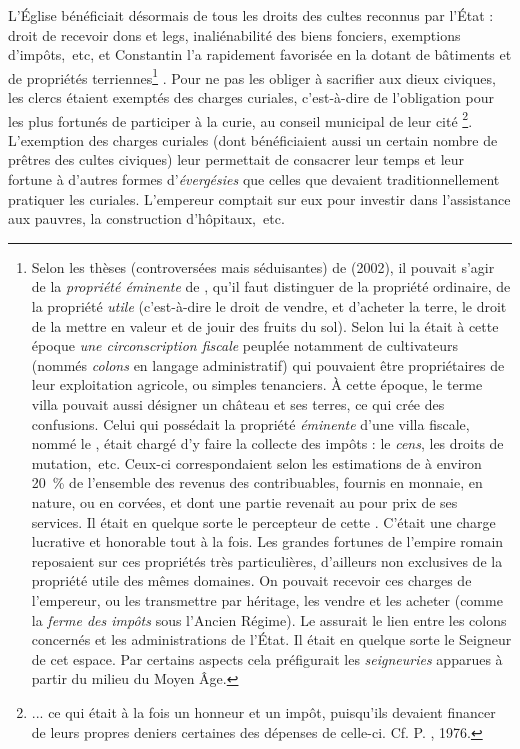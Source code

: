  L'Église bénéficiait désormais de tous les droits des cultes reconnus par l'État : droit de recevoir dons et legs, inaliénabilité des biens fonciers, exemptions d'impôts,~etc, et Constantin l'a rapidement favorisée en la dotant de bâtiments et de propriétés terriennes\footnote{Selon les thèses (controversées mais séduisantes) de  (2002), il pouvait s'agir de la \emph{propriété éminente} de , qu'il faut distinguer de la propriété ordinaire, de la propriété \emph{utile} (c'est-à-dire le droit de vendre, et d'acheter la terre, le droit de la mettre en valeur et de jouir des fruits du sol). Selon lui la  était à cette époque \emph{une circonscription fiscale} peuplée notamment de cultivateurs (nommés \emph{colons} en langage administratif) qui pouvaient être propriétaires de leur exploitation agricole, ou simples tenanciers. À cette époque, le terme villa pouvait aussi désigner un château et ses terres, ce qui crée des confusions. Celui qui possédait la propriété \emph{éminente} d'une villa fiscale, nommé le , était chargé d'y faire la collecte des impôts : le \emph{cens}, les droits de mutation,~etc. Ceux-ci correspondaient selon les estimations de  à environ 20~\% de l'ensemble des revenus des contribuables, fournis en monnaie, en nature, ou en corvées, et dont une partie revenait au  pour prix de ses services. Il était en quelque sorte le percepteur de cette . C'était une charge lucrative et honorable tout à la fois. Les grandes fortunes de l'empire romain reposaient sur ces propriétés très particulières, d'ailleurs non exclusives de la propriété utile des mêmes domaines. On pouvait recevoir ces charges de l'empereur, ou les transmettre par héritage, les vendre et les acheter (comme la \emph{ferme des impôts} sous l'Ancien Régime). Le  assurait le lien entre les colons concernés et les administrations de l'État. Il était en quelque sorte le Seigneur de cet espace. Par certains aspects cela préfigurait les \emph{seigneuries} apparues à partir du milieu du Moyen Âge.}%
. Pour ne pas les obliger à sacrifier aux dieux civiques, les clercs étaient exemptés des charges curiales, c'est-à-dire de l'obligation pour les plus fortunés de participer à la curie, au conseil municipal de leur cité
\footnote{... ce qui était à la fois un honneur et un impôt, puisqu'ils devaient financer de leurs propres deniers certaines des dépenses de celle-ci. Cf. P. , 1976.}. L'exemption des charges curiales (dont bénéficiaient aussi un certain nombre de prêtres des cultes civiques) leur permettait de consacrer leur temps et leur fortune à d'autres formes d'\emph{évergésies} que celles que devaient traditionnellement pratiquer les curiales. L'empereur comptait sur eux pour investir dans l'assistance aux pauvres, la construction d'hôpitaux,~etc. 

